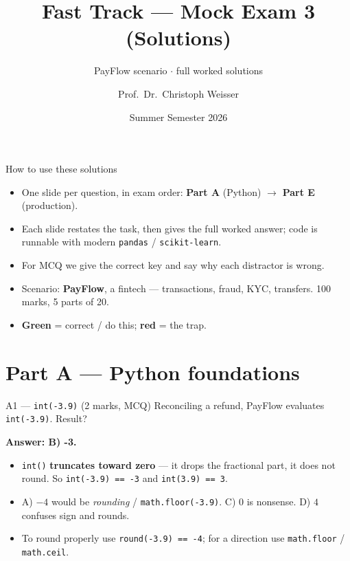 \documentclass[aspectratio=169,11pt]{beamer}
\title{Fast Track --- Mock Exam 3 (Solutions)}
\subtitle{PayFlow scenario $\cdot$ full worked solutions}
\author{Prof.\ Dr.\ Christoph Weisser}
\institute{HSBI}
\date{Summer Semester 2026}
\begin{document}
\begin{frame}\titlepage\end{frame}
\begin{frame}{How to use these solutions}
\begin{itemize}
  \item One slide per question, in exam order: \textbf{Part A} (Python) $\to$ \textbf{Part E} (production).
  \item Each slide restates the task, then gives the full worked answer; code is runnable with modern \texttt{pandas} / \texttt{scikit-learn}.
  \item For MCQ we give the \textcolor{cgreen}{correct key} and say why each distractor is wrong.
  \item Scenario: \textbf{PayFlow}, a fintech --- transactions, fraud, KYC, transfers. 100 marks, 5 parts of 20.
  \item \textbf{Green} = correct / do this; \textcolor{cred}{\textbf{red}} = the trap.
\end{itemize}
\end{frame}

\section{Part A --- Python foundations}

\begin{frame}[fragile]{A1 --- \texttt{int(-3.9)} \hfill (2 marks, MCQ)}
Reconciling a refund, PayFlow evaluates \texttt{int(-3.9)}. Result?
\medskip

\textbf{Answer: B) \textcolor{cgreen}{-3}.}
\begin{itemize}
  \item \texttt{int()} \textbf{truncates toward zero} --- it drops the fractional part, it does not round. So \texttt{int(-3.9) == -3} and \texttt{int(3.9) == 3}.
  \item A) $-4$ would be \emph{rounding} / \texttt{math.floor(-3.9)}. C) $0$ is nonsense. D) $4$ confuses sign and rounds.
  \item To round properly use \texttt{round(-3.9) == -4}; for a direction use \texttt{math.floor} / \texttt{math.ceil}.
\end{itemize}
\end{frame}
\end{document}
